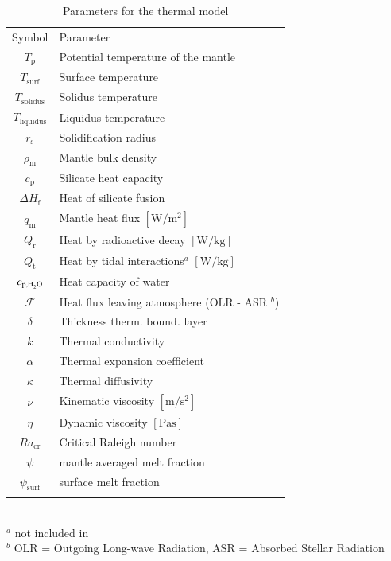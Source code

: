 \documentclass[paper=letterpaper,fontsize=12pt,oneside,twocolumn]{article}
\begin{document}
\begin{table}[h]
    \caption[Parameters thermal model]{Parameters for the thermal model}
    \begin{tabular}{cl}
    	\noalign{\smallskip}
    	\hline
    	\noalign{\smallskip}
    	Symbol & Parameter \\ 
    	\noalign{\smallskip}
    	\hline \hline
    	\noalign{\smallskip}
    	$T_\mathrm{p}$ & Potential temperature of the mantle \\
    	$T_\mathrm{surf}$ & Surface temperature \\
    	$T_\mathrm{solidus}$ & Solidus temperature \\
    	$T_\mathrm{liquidus}$ & Liquidus temperature \\
    	$r_\mathrm{s}$ & Solidification radius \\
    	$\rho_\mathrm{m}$ & Mantle bulk density \\ 
    	$c_\mathrm{p} $ & Silicate heat capacity \\
    	$\Delta H_\mathrm{f}$ & Heat of silicate fusion \\
    	$q_\mathrm{m}$ & Mantle heat flux $[\si{\watt\per\square\metre}]$\\
    	$Q_\mathrm{r}$ & Heat by radioactive decay $[\si{\watt\per\kilogram}]$\\
    	$Q_\mathrm{t}$ & Heat by tidal interactions${}^{a}$ $[\si{\watt\per\kilogram}]$\\
    	$c_{\mathrm{p},\ce{H2O}} $ & Heat capacity of water \\
    	$\mathcal{F}$ & Heat flux leaving atmosphere (OLR - ASR ${}^{b}$)\\
    	$\delta$ &Thickness therm. bound. layer \\
    	$k$ & Thermal conductivity \\
    	$\alpha$ & Thermal expansion coefficient \\
    	$\kappa$ & Thermal diffusivity \\
    	$\nu$ & Kinematic viscosity $[\si{\metre\per\second\squared}]$\\
    	$\eta$ & Dynamic viscosity $[\si{\pascal\second}]$\\
    	$Ra_\mathrm{cr}$ & Critical Raleigh number \\
    	$\psi$ & mantle averaged melt fraction \\
    	$\psi_\mathrm{surf}$ & surface melt fraction \\
    	\noalign{\smallskip}
    	\hline
    \end{tabular}
    \\
    ${}^{a}$ not included in \citet{Schaefer2016}\\
    ${}^{b}$ OLR = Outgoing Long-wave Radiation, ASR = Absorbed Stellar Radiation
    \label{Tab_Therm_Model}
\end{table}
\end{document}
